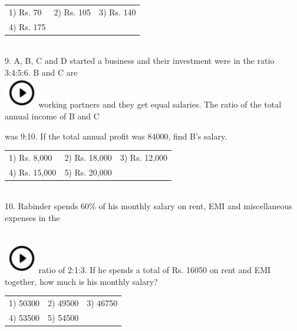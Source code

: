 \documentclass{article}
\begin{document}
\noindent 

\noindent \begin{tabular}{p{1.7in} p{1.6in} p{1.6in}} \\ 
 1) Rs. 70                     &  2) Rs. 105            &  3) Rs. 140             \\
4) Rs. 175 \\
\end{tabular}

\noindent  \\  9.   A, B, C and D started a business and their investment were in the ratio 3:4:5:6. B and C are  
	\noindent \\ \includegraphics*[width=0.60in, height=0.52in]{images/image1}working partners and they get equal salaries. The ratio of the total annual income of B and C

\noindent was 9:10. If the total annual profit was 84000, find B's salary.

\noindent 


	\begin{tabular}{p{1.7in} p{1.6in} p{1.6in}} \\ 
 1) Rs. 8,000  &  2) Rs. 18,000  &  3) Rs. 12,000
	\\
4) Rs. 15,000  & 5) Rs. 20,000  \\
\end{tabular}




\noindent 

\noindent  \\  10. Rabinder spends 60\% of his monthly salary on rent, EMI and miscellaneous expenses in the

\noindent  
	\noindent \\ \includegraphics*[width=0.60in, height=0.52in]{images/image1}ratio of 2:1:3.  If he spends a total of Rs. 16050 on rent and EMI together, how much is his monthly salary?

\noindent 

\noindent \begin{tabular}{p{1.7in} p{1.6in} p{1.6in}} \\ 
 1) 50300                  &  2) 49500           &  3) 46750           \\
4) 53500           & 5) 54500 \\
\end{tabular}
\end{document}

